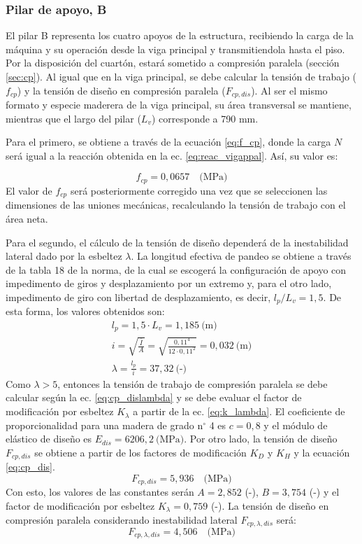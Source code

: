 \subsubsection{Pilar de apoyo, B}
El pilar B representa los cuatro apoyos de la estructura, recibiendo la carga de la máquina y su operación desde la viga principal y transmitiendola hasta el piso. Por la disposición del cuartón, estará sometido a compresión paralela (sección \ref{sec:cp}). Al igual que en la viga principal, se debe calcular la tensión de trabajo ($f_{cp}$) y la tensión de diseño en compresión paralela ($F_{cp,dis}$). Al ser el mismo formato y especie maderera de la viga principal, su área transversal se mantiene, mientras que el largo del pilar ($L_v$) corresponde a 790 mm.

Para el primero, se obtiene a través de la ecuación \ref{eq:f_cp}, donde la carga $N$ será igual a la reacción obtenida en la ec. \ref{eq:reac_vigappal}. Así, su valor es:


\begin{equation}
	f_{cp} = 0,0657 \quad \text{(MPa)} 
\end{equation}
El valor de $f_{cp}$ será posteriormente corregido una vez que se seleccionen las dimensiones de las uniones mecánicas, recalculando la tensión de trabajo con el área neta.

Para el segundo, el cálculo de la tensión de diseño dependerá de la inestabilidad lateral dado por la esbeltez $\lambda$. La longitud efectiva de pandeo se obtiene a través de la tabla 18 de la norma, de la cual se escogerá la configuración de apoyo con impedimento de giros y desplazamiento por un extremo y, para el otro lado, impedimento de giro con libertad de desplazamiento, es decir, $l_p/L_v = 1,5$. De esta forma, los valores obtenidos son:
\begin{gather*}
	l_p = 1,5\cdot L_v = 1,185 \: \text{(m)}\\
	i = \sqrt{\frac{\bar{I}}{A}} = \sqrt{\frac{0,11^4}{12\cdot 0,11^2}} = 0,032 \: \text{(m)}\\
	\lambda = \frac{l_p}{i} = 37,32 \: \text{(-)}
\end{gather*}
Como $\lambda > 5$, entonces la tensión de trabajo de compresión paralela se debe calcular según la ec. \ref{eq:cp_dislambda} y se debe evaluar el factor de modificación por esbeltez $K_{\lambda}$ a partir de la ec. \ref{eq:k_lambda}. El coeficiente de proporcionalidad para una madera de grado n$^{\circ}$ 4 es $c = 0,8$ y el módulo de elástico de diseño es $E_{dis} = 6206,2\: \text{(MPa)}$. Por otro lado, la tensión de diseño $F_{cp,dis}$ se obtiene a partir de los factores de modificación $K_D$ y $K_H$ y la ecuación \ref{eq:cp_dis}.
\begin{equation}
	F_{cp,dis} = 5,936 \quad \text{(MPa)}
\end{equation}
Con esto, los valores de las constantes serán $A = 2,852$ (-), $B = 3,754$ (-) y el factor de modificación por esbeltez $K_{\lambda} = 0,759$ (-). La tensión de diseño en compresión paralela considerando inestabilidad lateral $F_{cp,\lambda, dis}$ será:
\begin{equation}
	F_{cp,\lambda, dis} = 4,506 \quad \text{(MPa)}
\end{equation}

